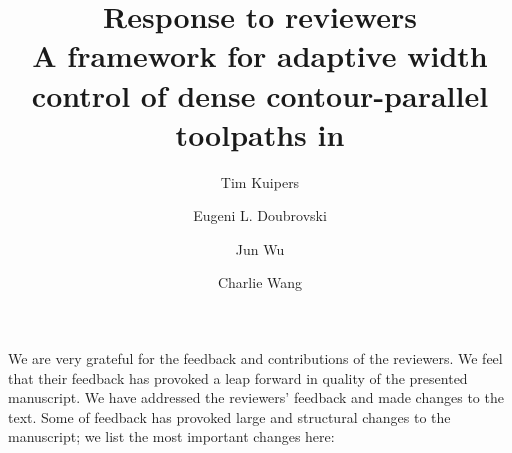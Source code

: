 \documentclass[5p,10pt,times]{elsarticle}
\theoremstyle{definition}
\newcommand{\revise}[2]{{\color{red}{#1}\color{blue}{#2}}}
\numberwithin{question}{section}
\begin{document}
\baselineskip11pt 

\begin{frontmatter} 

\title{
Response to reviewers
\\
\large{A framework for adaptive width control of dense contour-parallel toolpaths in \revise{additive manufacturing}{fused deposition modeling}}
}



\author[um,tud]{Tim Kuipers}
\author[tud]{Eugeni L. Doubrovski}
\author[tud]{Jun Wu}
\author[cuhk]{Charlie Wang}
\address[um]{Ultimaker, Utrecht, The Netherlands}
\address[tud]{Department of Design Engineering, Delft University of Technology, The Netherlands}
\address[cuhk]{Department of Mechanical and Automation Engineering, The Chinese University of Hong Kong, Hong Kong SAR, China}

%
%


\end{frontmatter}

We are very grateful for the feedback and contributions of the reviewers.
We feel that their feedback has provoked a leap forward in quality of the presented manuscript.
We have addressed the reviewers' feedback and made changes to the text.
Some of feedback has provoked large and structural changes to the manuscript;
we list the most important changes here:
\end{document}
